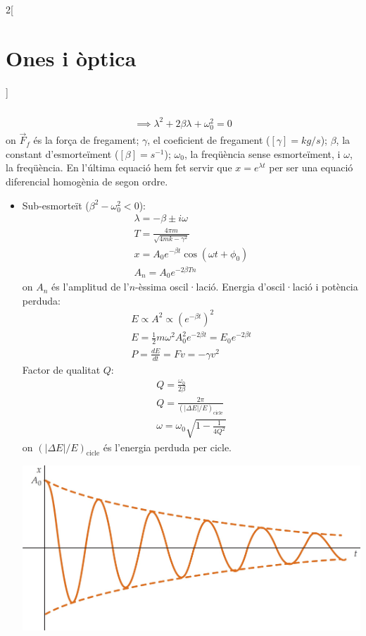 \documentclass[../../../main.tex]{subfiles}
\begin{document}
\begin{multicols}{2}[\section{Ones i òptica}]
\begin{gather*}
\begin{multlined}
    \end{multlined}\\
    \implies\lambda^2+2\beta\lambda+\omega_0^2=0
\end{gather*}
{\footnotesize on $\Vec{F}_f$ és la força de fregament; $\gamma$, el coeficient de fregament ($[\gamma]=kg/s$); $\beta$, la constant d'esmorteïment ($[\beta]=s^{-1}$); $\omega_0$, la freqüència sense esmorteïment, i $\omega$, la freqüència. En l'última equació hem fet servir que $x=e^{\lambda t}$ per ser una equació diferencial homogènia de segon ordre.}
\begin{itemize}
    \item Sub-esmorteït ($\beta^2-\omega_0^2<0$):
    \begin{gather*}
        \lambda=-\beta\pm i\omega\\
        T=\frac{4\pi m}{\sqrt{4mk-\gamma^2}}\\
        x=A_0e^{-\beta t}\cos(\omega t+\phi_0)\\
        A_n=A_0e^{-2\beta Tn}
    \end{gather*} {\footnotesize on $A_n$ és l'amplitud de l'$n$-èssima oscil·lació.}\newline
    Energia d'oscil·lació i potència perduda:
    \begin{gather*}
        E\propto A^2\propto (e^{-\beta t})^2\\
        E=\frac{1}{2}m\omega^2A_0^2e^{-2\beta t}=E_0e^{-2\beta t}\\
        P=\frac{dE}{dt}=Fv=-\gamma v^2
    \end{gather*}
    Factor de qualitat $Q$:
    \begin{gather*}
        Q=\frac{\omega_0}{2\beta}\\
        Q=\frac{2\pi}{(|\Delta E|/E)_{\text{cicle}}}\\
        \omega=\omega_0\sqrt{1-\frac{1}{4Q^2}}
    \end{gather*} {\footnotesize on $(|\Delta E|/E)_{\text{cicle}}$ és l'energia perduda per cicle.}\newline
    \begin{minipage}{\linewidth}
       \centering
       \includegraphics[width=\linewidth]{Physics/1st/Waves_and_optics/Images/udamp.jpg}

\end{minipage}
\end{itemize}
\end{multicols}
\end{document}
